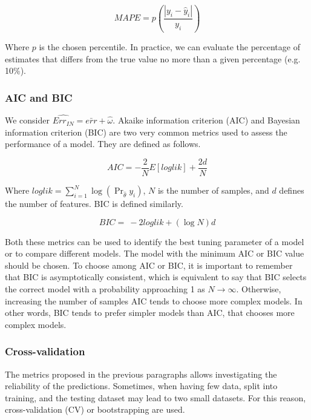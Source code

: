 \begin{equation}
MAPE=p\left(\frac{\left|y_i-{\hat{y}}_i\right|}{y_i}\right)
\label{eq_MAPE}
\end{equation}

Where $p$ is the chosen percentile. In practice, we can evaluate the percentage of estimates that differs from the true value no more than a given percentage (e.g. 10\%).

\subsubsection{AIC and BIC}

We consider $\widehat{Err_{IN}}=\bar{err}+\hat{\omega}$. Akaike information criterion (AIC) and Bayesian information criterion (BIC) are two very common metrics used to assess the performance of a model. They are defined as follows.

\begin{equation}
AIC=-\frac{2}{N}E\left[loglik\right]+\frac{2d}{N}
\label{eq_AIC}
\end{equation}

Where $loglik=\sum_{i=1}^{N}{\log(\Pr_{\hat{\theta}}{y_i})}$, $N$ is the number of samples, and $d$ defines the number of features. BIC is defined similarly.

\begin{equation}
BIC=\ -2loglik+(\log{N})d
\label{eq_BIC}
\end{equation}

Both these metrics can be used to identify the best tuning parameter of a model or to compare different models. The model with the minimum AIC or BIC value should be chosen. To choose among AIC or BIC, it is important to remember that BIC is asymptotically consistent, which is equivalent to say that BIC selects the correct model with a probability approaching 1 as $N\rightarrow\infty$. Otherwise, increasing the number of samples AIC tends to choose more complex models. In other words, BIC tends to prefer simpler models than AIC, that chooses more complex models.

\subsubsection{Cross-validation}
The metrics proposed in the previous paragraphs allows investigating the reliability of the predictions. Sometimes, when having few data, split into training, and the testing dataset may lead to two small datasets. For this reason, cross-validation (CV) or bootstrapping are used.\par

